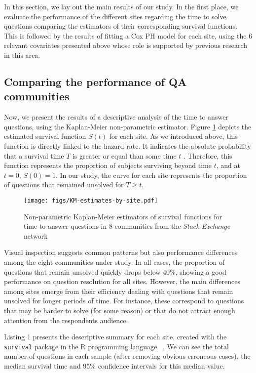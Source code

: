 \documentclass{chi2012}
\begin{document}
In this section, we lay out the main results of our study. In the first place, we evaluate
the performance of the different sites regarding the time to solve questions comparing the
estimators of their corresponding survival functions. This is followed by the results 
of fitting a Cox PH model for each site, using the 6 relevant covariates presented 
above whose role is supported by previous research in this area.

\subsection{Comparing the performance of QA communities}

Now, we present the results of a descriptive analysis of the time to answer questions, 
using the Kaplan-Meier non-parametric estimator. Figure \ref{fig:km-all-sites} 
depicts the estimated survival function $S(t)$ for each site. As we
introduced above, this function is directly linked to the hazard rate. It indicates the
absolute probability that a survival time $T$ is greater or equal than some time $t$
\cite{mills2011}. Therefore, this function represents the proportion of subjects surviving
beyond time $t$, and at $t=0$, $S(0)=1$. In our study, the curve for each site represents
the proportion of questions that remained unsolved for $T \geq t$.

\begin{figure}[!h]
\centering
\texttt{[image: figs/KM-estimates-by-site.pdf]}
\caption{Non-parametric Kaplan-Meier estimators of survival functions for time to answer questions in 8 communities from the \textit{Stack Exchange} network}
\label{fig:km-all-sites}
\end{figure}

Visual inspection suggests common patterns but also performance differences among the eight communities under study. In all cases, the proportion of questions that remain unsolved
quickly drops below 40\%, showing a good performance on question resolution for all
sites. However, the main differences among sites emerge from their efficiency dealing with
questions that remain unsolved for longer periods of time. For instance, these 
correspond to questions that may be harder to solve (for some reason) or that do not 
attract enough attention from the respondents audience. 

Listing 1 presents the descriptive summary for each site, created
with the \texttt{survival} package in the R programming language ~\cite{survival-package}.
We can see the total number of questions in each sample (after removing 
obvious erroneous cases), the median survival time and 95\% 
confidence intervals for this median value.
\end{document}
